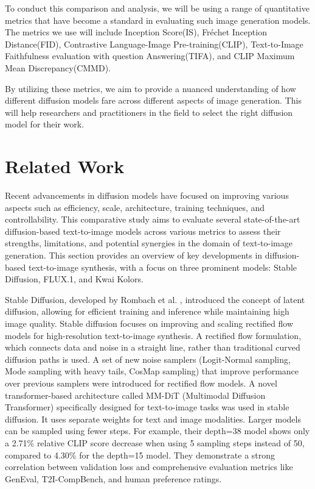 \documentclass{article}
\begin{document}
To conduct this comparison and analysis, we will be using a range of quantitative metrics that have become a standard 
in evaluating such image generation models. The metrics we use will include Inception Score(IS), Fréchet Inception Distance(FID),
Contrastive Language-Image Pre-training(CLIP), Text-to-Image Faithfulness evaluation with question Answering(TIFA), and 
CLIP Maximum Mean Discrepancy(CMMD). 

By utilizing these metrics, we aim to provide a nuanced understanding of how different diffusion models fare across different aspects
of image generation. This will help researchers and practitioners in the field to select the right diffusion model for their work. 



\section{Related Work}
Recent advancements in diffusion models have focused on improving various aspects such as efficiency, scale, 
architecture, training techniques, and controllability. This comparative study aims to evaluate several state-of-the-art 
diffusion-based text-to-image models across various metrics to assess their strengths, limitations, and potential synergies in the 
domain of text-to-image generation. This section provides an overview of key developments in diffusion-based text-to-image synthesis, 
with a focus on three prominent models: Stable Diffusion, FLUX.1, and Kwai Kolors.

Stable Diffusion, developed by Rombach et al. \cite{kulal2024stablediffusion}, introduced the concept of latent diffusion, allowing for efficient training 
and inference while maintaining high image quality. Stable diffusion focuses on improving and 
scaling rectified  flow models for high-resolution text-to-image synthesis. A rectified flow formulation, which connects 
data and noise in a straight 
line, rather than traditional curved diffusion paths is used. A set of new noise samplers (Logit-Normal sampling, Mode sampling 
with heavy tails, CosMap sampling) that improve performance over previous samplers were introduced for rectified flow models. 
A novel transformer-based architecture called MM-DiT (Multimodal Diffusion Transformer) specifically designed for text-to-image 
tasks was used in stable diffusion. It uses separate weights for text and image modalities. Larger models can be sampled using fewer 
steps. For example, their depth=38 model shows only a 2.71\% relative CLIP score decrease when using 5 sampling steps instead of 50, 
compared to 4.30\% for the depth=15 model. They demonstrate a strong correlation between validation loss and comprehensive 
evaluation metrics like GenEval, T2I-CompBench, and human preference ratings.
\end{document}
